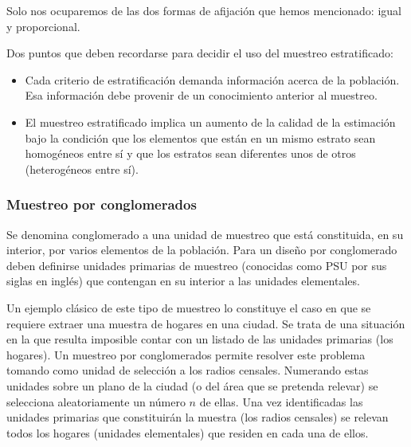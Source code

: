 \documentclass[]{article}
\begin{document}
Solo nos ocuparemos de las dos formas de afijación que hemos mencionado: igual y proporcional.

Dos puntos que deben recordarse para decidir el uso del muestreo
estratificado:

\begin{itemize}
\item
  Cada criterio de estratificación demanda información acerca de la
  población. Esa información debe provenir de un conocimiento anterior al
  muestreo.
\item
  El muestreo estratificado implica un aumento de la calidad de la
  estimación bajo la condición que los elementos que están en un mismo
  estrato sean homogéneos entre sí y que los estratos sean diferentes unos de otros (heterogéneos entre sí).
\end{itemize}

\hypertarget{muestreo-por-conglomerados}{%
\subsubsection{Muestreo por conglomerados}\label{muestreo-por-conglomerados}}

Se denomina conglomerado a una unidad de muestreo que está constituida,
en su interior, por varios elementos de la población. Para un diseño por
conglomerado deben definirse unidades primarias de muestreo (conocidas como PSU por sus siglas en inglés) que contengan en su interior a las unidades elementales.

Un ejemplo clásico de este tipo de muestreo lo constituye el caso en que
se requiere extraer una muestra de hogares en una ciudad. Se trata de
una situación en la que resulta imposible contar con un listado de las
unidades primarias (los hogares). Un muestreo por conglomerados permite
resolver este problema tomando como unidad de selección a los radios censales. Numerando estas unidades sobre un plano de la ciudad (o del
área que se pretenda relevar) se selecciona aleatoriamente un número \(n\) de ellas. Una vez identificadas las unidades primarias que constituirán
la muestra (los radios censales) se relevan todos los hogares (unidades elementales) que residen en cada una de ellos.
\end{document}
